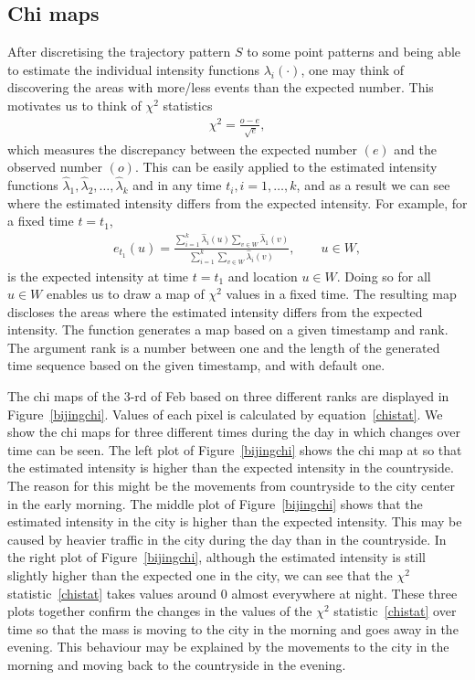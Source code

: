 \documentclass[article]{jss}
\begin{document}
  \subsection{Chi maps}
  After discretising the trajectory pattern $S$ to some point patterns and being able to estimate the individual intensity functions $\lambda_i(\cdot)$, one may think of discovering the areas with more/less events than the expected number. This motivates us to think of $\chi^2$ statistics 
  \begin{eqnarray}\label{chistat}
  \chi^2 =\frac{o-e}{\sqrt[]{e}},
  \end{eqnarray}
  which measures the discrepancy between the expected number $(e)$ and the observed number $(o)$. This can be easily applied to the estimated intensity functions $\widehat{\lambda}_1,\widehat{\lambda}_2,\ldots,\widehat{\lambda}_k$ and in any time $t_i, i=1,\ldots,k$, and as a result we can see where the estimated intensity differs from the expected intensity. For example, for a fixed time $t=t_1$,
  \begin{eqnarray*}
  e_{t_1}(u)=\frac{\sum\limits_{i=1}^k \widehat{\lambda}_i(u) \sum\limits_{v \in W} \widehat{\lambda}_1(v)}{\sum\limits_{i=1}^{k}\sum\limits_{v \in W} \widehat{\lambda}_i (v)}, \qquad u \in W,
  \end{eqnarray*}
  is the expected intensity at time $t=t_1$ and location $u \in W$. Doing so for all $u \in W$ enables us to draw a map of $\chi^2$ values in a fixed time. The resulting map discloses the areas where the estimated intensity differs from the expected intensity. The function  generates a map based on a given timestamp and rank. The argument rank is a number between one and the length of the generated time sequence based on the given timestamp, and with default one.
  
  The chi maps of the $3$-rd of Feb based on three different ranks are displayed in Figure~\ref{bijingchi}. Values of each pixel is calculated by equation~\ref{chistat}.  We show the chi maps for three different times during the day in which changes over time can be seen. The left plot of Figure~\ref{bijingchi} shows the chi map at  so that the estimated intensity is higher than the expected intensity in the countryside. The reason for this might be the movements from countryside to the city center in the early morning. The middle plot of Figure~\ref{bijingchi} shows that the estimated intensity in the city is higher than the expected intensity. This may be caused  by heavier traffic in the city during the day than in the countryside. In the right plot of Figure~\ref{bijingchi}, although the estimated intensity is still slightly higher than the expected one in the city, we can see that the $\chi^2$ statistic~\ref{chistat} takes values around $0$ almost everywhere at night. These three plots together confirm the changes in the values of the $\chi^2$ statistic~\ref{chistat} over time so that the mass is moving to the city in the morning and goes away in the evening. This behaviour may be explained by the movements to the city in the morning and moving back to the countryside in the evening.
\end{document}
